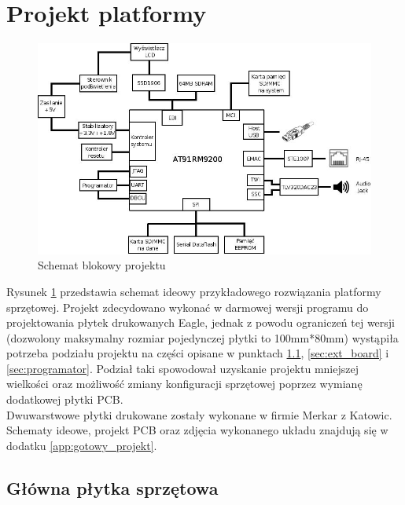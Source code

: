 \documentclass[a4paper,12pt]{book}
\begin{document}
		\section{Projekt platformy}
			\label{sec:projekt_platformy}
				\begin{figure}[h!]
					\begin{center}
						\includegraphics[scale=0.6]{img/schematic.jpg}
						\caption{Schemat blokowy projektu}
						\label{fig:block_schematic}
					\end{center}
				\end{figure}
				Rysunek \ref{fig:block_schematic} przedstawia schemat ideowy przykładowego rozwiązania platformy sprzętowej. Projekt zdecydowano wykonać w darmowej wersji programu do projektowania płytek drukowanych Eagle, jednak z powodu ograniczeń tej wersji (dozwolony maksymalny rozmiar pojedynczej płytki to 100mm*80mm) wystąpiła potrzeba podziału projektu na części opisane w punktach \ref{sec:main_board}, \ref{sec:ext_board} i \ref{sec:programator}. Podział taki spowodował uzyskanie projektu mniejszej wielkości oraz możliwość zmiany konfiguracji sprzętowej poprzez wymianę dodatkowej płytki PCB.\\
				Dwuwarstwowe płytki drukowane zostały wykonane w firmie Merkar z Katowic.\\
				Schematy ideowe, projekt PCB oraz zdjęcia wykonanego układu znajdują się w dodatku \ref{app:gotowy_projekt}.
			\subsection{Główna płytka sprzętowa}
				\label{sec:main_board}
\end{document}
